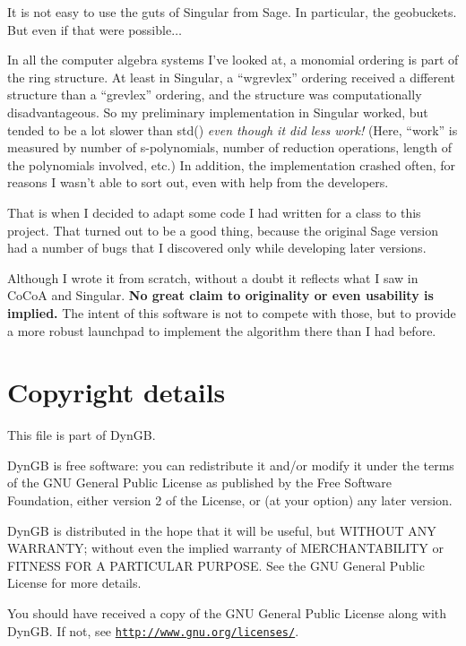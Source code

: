 \begin{DoxyItemize}
\item It is not easy to use the guts of Singular from Sage. In particular, the geobuckets. But even if that were possible{$\dots$} \item In all the computer algebra systems I've looked at, a monomial ordering is part of the ring structure. At least in Singular, a ``wgrevlex'' ordering received a different structure than a ``grevlex'' ordering, and the structure was computationally disadvantageous. So my preliminary implementation in Singular worked, but tended to be a lot slower than {\ttfamily std()} {\itshape even though it did less work!} (Here, ``work'' is measured by number of s-\/polynomials, number of reduction operations, length of the polynomials involved, etc.) In addition, the implementation crashed often, for reasons I wasn't able to sort out, even with help from the developers.\end{DoxyItemize}
That is when I decided to adapt some code I had written for a class to this project. That turned out to be a good thing, because the original Sage version had a number of bugs that I discovered only while developing later versions.

Although I wrote it from scratch, without a doubt it reflects what I saw in Co\+CoA and Singular. {\bfseries No great claim to originality or even usability is implied.} The intent of this software is not to compete with those, but to provide a more robust launchpad to implement the algorithm there than I had before.\hypertarget{index_Copyright}{}\section{Copyright details}\label{index_Copyright}
This file is part of Dyn\+GB.

Dyn\+GB is free software\+: you can redistribute it and/or modify it under the terms of the G\+NU General Public License as published by the Free Software Foundation, either version 2 of the License, or (at your option) any later version.

Dyn\+GB is distributed in the hope that it will be useful, but W\+I\+T\+H\+O\+UT A\+NY W\+A\+R\+R\+A\+N\+TY; without even the implied warranty of M\+E\+R\+C\+H\+A\+N\+T\+A\+B\+I\+L\+I\+TY or F\+I\+T\+N\+E\+SS F\+OR A P\+A\+R\+T\+I\+C\+U\+L\+AR P\+U\+R\+P\+O\+SE. See the G\+NU General Public License for more details.

You should have received a copy of the G\+NU General Public License along with Dyn\+GB. If not, see \href{http://www.gnu.org/licenses/}{\tt http\+://www.\+gnu.\+org/licenses/}. 